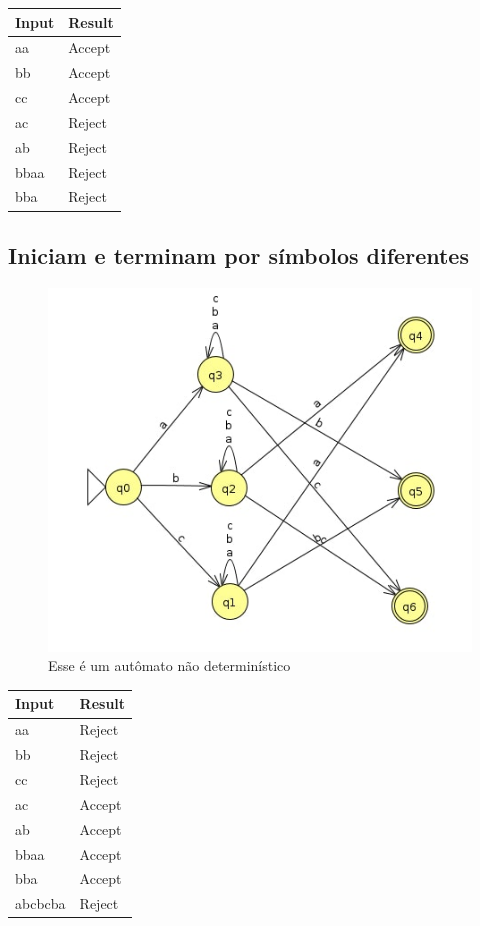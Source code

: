 \documentclass[11pt]{article}
\begin{document}
\begin{center}
\begin{tabular}{ll}
Input & Result\\
\hline
aa & Accept\\
bb & Accept\\
cc & Accept\\
ac & Reject\\
ab & Reject\\
bbaa & Reject\\
bba & Reject\\
\end{tabular}
\end{center}
\pagebreak
\subsection{Iniciam e terminam por símbolos diferentes}
\label{sec:org1f27122}

\begin{figure}[htbp]
\centering
\includegraphics[width=.9\linewidth]{./q1/f/q1f.jpg}
\caption{\label{fig:org67f1480}
Esse é um autômato não determinístico}
\end{figure}

\begin{center}
\begin{tabular}{ll}
Input & Result\\
\hline
aa & Reject\\
bb & Reject\\
cc & Reject\\
ac & Accept\\
ab & Accept\\
bbaa & Accept\\
bba & Accept\\
abcbcba & Reject\\
\end{tabular}
\end{center}
\end{document}
